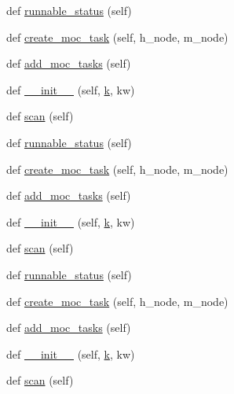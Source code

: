 \begin{DoxyCompactItemize}
def \hyperlink{classwaflib_1_1_tools_1_1qt4_1_1qxx_aa3fd0759668664632f019ae7c118406d}{runnable\+\_\+status} (self)
\item 
def \hyperlink{classwaflib_1_1_tools_1_1qt4_1_1qxx_aff019276ea1c24be0da32fb4a6d3da06}{create\+\_\+moc\+\_\+task} (self, h\+\_\+node, m\+\_\+node)
\item 
def \hyperlink{classwaflib_1_1_tools_1_1qt4_1_1qxx_aec5aad1a23675343a8b270b0e8c15b0c}{add\+\_\+moc\+\_\+tasks} (self)
\item 
def \hyperlink{classwaflib_1_1_tools_1_1qt4_1_1qxx_a7bc6ffa8a31c2b612eb2fac82ab4c052}{\+\_\+\+\_\+init\+\_\+\+\_\+} (self, \hyperlink{rfft2d_test_m_l_8m_adc468c70fb574ebd07287b38d0d0676d}{k}, kw)
\item 
def \hyperlink{classwaflib_1_1_tools_1_1qt4_1_1qxx_acdd5c674e2585b425a25735b665eeb14}{scan} (self)
\item 
def \hyperlink{classwaflib_1_1_tools_1_1qt4_1_1qxx_aa3fd0759668664632f019ae7c118406d}{runnable\+\_\+status} (self)
\item 
def \hyperlink{classwaflib_1_1_tools_1_1qt4_1_1qxx_aff019276ea1c24be0da32fb4a6d3da06}{create\+\_\+moc\+\_\+task} (self, h\+\_\+node, m\+\_\+node)
\item 
def \hyperlink{classwaflib_1_1_tools_1_1qt4_1_1qxx_aec5aad1a23675343a8b270b0e8c15b0c}{add\+\_\+moc\+\_\+tasks} (self)
\item 
def \hyperlink{classwaflib_1_1_tools_1_1qt4_1_1qxx_a7bc6ffa8a31c2b612eb2fac82ab4c052}{\+\_\+\+\_\+init\+\_\+\+\_\+} (self, \hyperlink{rfft2d_test_m_l_8m_adc468c70fb574ebd07287b38d0d0676d}{k}, kw)
\item 
def \hyperlink{classwaflib_1_1_tools_1_1qt4_1_1qxx_acdd5c674e2585b425a25735b665eeb14}{scan} (self)
\item 
def \hyperlink{classwaflib_1_1_tools_1_1qt4_1_1qxx_aa3fd0759668664632f019ae7c118406d}{runnable\+\_\+status} (self)
\item 
def \hyperlink{classwaflib_1_1_tools_1_1qt4_1_1qxx_aff019276ea1c24be0da32fb4a6d3da06}{create\+\_\+moc\+\_\+task} (self, h\+\_\+node, m\+\_\+node)
\item 
def \hyperlink{classwaflib_1_1_tools_1_1qt4_1_1qxx_aec5aad1a23675343a8b270b0e8c15b0c}{add\+\_\+moc\+\_\+tasks} (self)
\item 
def \hyperlink{classwaflib_1_1_tools_1_1qt4_1_1qxx_a7bc6ffa8a31c2b612eb2fac82ab4c052}{\+\_\+\+\_\+init\+\_\+\+\_\+} (self, \hyperlink{rfft2d_test_m_l_8m_adc468c70fb574ebd07287b38d0d0676d}{k}, kw)
\item 
def \hyperlink{classwaflib_1_1_tools_1_1qt4_1_1qxx_acdd5c674e2585b425a25735b665eeb14}{scan} (self)

\end{DoxyCompactItemize}
